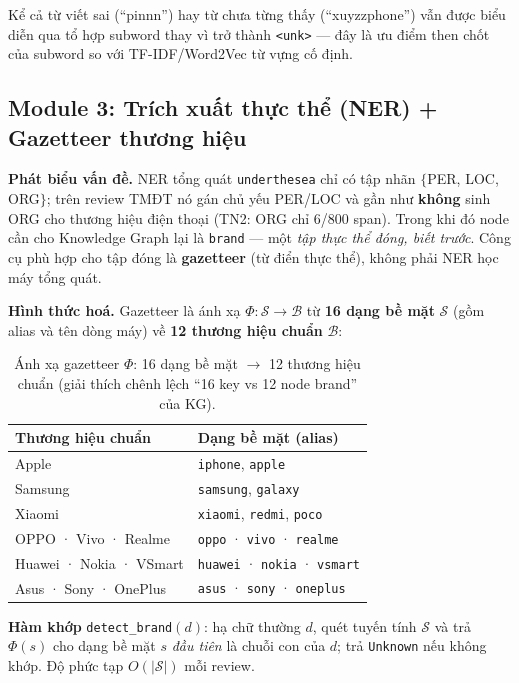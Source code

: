 \documentclass[12pt,a4paper]{article}
\begin{document}
\noindent Kể cả từ viết sai (``pinnn'') hay từ chưa từng thấy (``xuyzzphone'') vẫn được biểu diễn qua tổ hợp subword thay vì trở thành \texttt{<unk>} --- đây là ưu điểm then chốt của subword so với TF-IDF/Word2Vec từ vựng cố định.

\subsection{Module 3: Trích xuất thực thể (NER) + Gazetteer thương hiệu}
\label{sec:module3}

\textbf{Phát biểu vấn đề.} NER tổng quát \texttt{underthesea} chỉ có tập nhãn $\{$PER, LOC, ORG$\}$; trên review TMĐT nó gán chủ yếu PER/LOC và gần như \textbf{không} sinh ORG cho thương hiệu điện thoại (TN2: ORG chỉ 6/800 span). Trong khi đó node cần cho Knowledge Graph lại là \texttt{brand} --- một \textit{tập thực thể đóng, biết trước}. Công cụ phù hợp cho tập đóng là \textbf{gazetteer} (từ điển thực thể), không phải NER học máy tổng quát.

\textbf{Hình thức hoá.} Gazetteer là ánh xạ $\Phi:\mathcal{S}\to\mathcal{B}$ từ \textbf{16 dạng bề mặt} $\mathcal{S}$ (gồm alias và tên dòng máy) về \textbf{12 thương hiệu chuẩn} $\mathcal{B}$:

\begin{table}[H]
\centering\small
\caption{Ánh xạ gazetteer $\Phi$: 16 dạng bề mặt $\to$ 12 thương hiệu chuẩn (giải thích chênh lệch ``16 key vs 12 node brand'' của KG).}
\renewcommand{\arraystretch}{1.15}
\begin{tabular}{ll}
\toprule
\textbf{Thương hiệu chuẩn} & \textbf{Dạng bề mặt (alias)} \\
\midrule
Apple   & \texttt{iphone}, \texttt{apple} \\
Samsung & \texttt{samsung}, \texttt{galaxy} \\
Xiaomi  & \texttt{xiaomi}, \texttt{redmi}, \texttt{poco} \\
OPPO · Vivo · Realme & \texttt{oppo} · \texttt{vivo} · \texttt{realme} \\
Huawei · Nokia · VSmart & \texttt{huawei} · \texttt{nokia} · \texttt{vsmart} \\
Asus · Sony · OnePlus & \texttt{asus} · \texttt{sony} · \texttt{oneplus} \\
\bottomrule
\end{tabular}
\end{table}

\noindent\textbf{Hàm khớp} \texttt{detect\_brand}$(d)$: hạ chữ thường $d$, quét tuyến tính $\mathcal{S}$ và trả $\Phi(s)$ cho dạng bề mặt $s$ \textit{đầu tiên} là chuỗi con của $d$; trả \texttt{Unknown} nếu không khớp. Độ phức tạp $O(|\mathcal{S}|)$ mỗi review.
\end{document}
